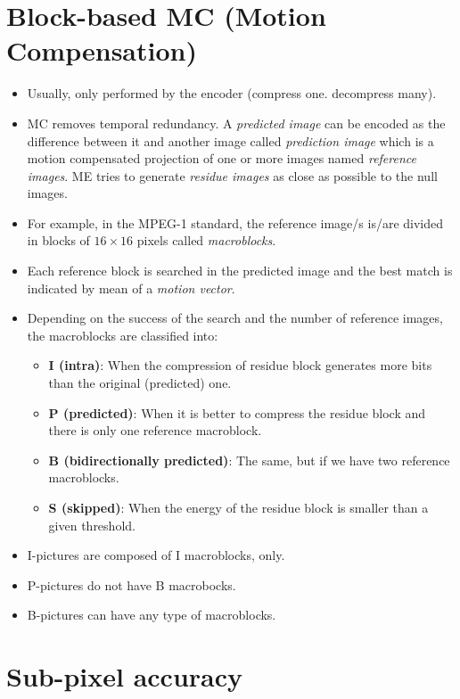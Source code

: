 \section{Block-based MC (Motion Compensation)~\cite{rao1996techniques}}
\begin{itemize}
\tightlist
\item
  Usually, only performed by the encoder (compress one. decompress
  many).
\item
  MC removes temporal redundancy. A \emph{predicted image} can be
  encoded as the difference between it and another image called
  \emph{prediction image} which is a motion compensated projection of
  one or more images named \emph{reference images}. ME tries to generate
  \emph{residue images} as close as possible to the null images.
\item
  For example, in the MPEG-1 standard, the reference image/s is/are
  divided in blocks of \(16\times 16\) pixels called \emph{macroblocks}.
\item
  Each reference block is searched in the predicted image and the best
  match is indicated by mean of a \emph{motion vector}.
\item
  Depending on the success of the search and the number of reference
  images, the macroblocks are classified into:

  \begin{itemize}
  \tightlist
  \item
    \textbf{I (intra)}: When the compression of residue block generates
    more bits than the original (predicted) one.
  \item
    \textbf{P (predicted)}: When it is better to compress the residue
    block and there is only one reference macroblock.
  \item
    \textbf{B (bidirectionally predicted)}: The same, but if we have two
    reference macroblocks.
  \item
    \textbf{S (skipped)}: When the energy of the residue block is
    smaller than a given threshold.
  \end{itemize}
\item
  I-pictures are composed of I macroblocks, only.
\item
  P-pictures do not have B macrobocks.
\item
  B-pictures can have any type of macroblocks.
\end{itemize}


\section{Sub-pixel accuracy}

